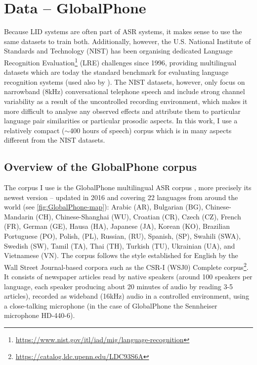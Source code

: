 \documentclass[bsc,frontabs,twoside,singlespacing,parskip,deptreport]{infthesis}
\begin{document}
\chapter{Data -- GlobalPhone}{
  \label{chap:Data}
  Because LID systems are often part of ASR systems, it makes sense to use the same datasets to train both.
  Additionally, however, the U.S. National Institute of Standards and Technology (NIST) has been organising dedicated Language Recognition Evaluation\footnote{\url{https://www.nist.gov/itl/iad/mig/language-recognition}} (LRE) challenges since 1996, providing multilingual datasets which are today the standard benchmark for evaluating language recognition systems (used also by \citet{Snyder_et_al_2018}). The NIST datasets, however, only focus on narrowband (8kHz) conversational telephone speech and include strong channel variability as a result of the uncontrolled recording environment, which makes it more difficult to analyse any observed effects and attribute them to particular language pair similarities or particular prosodic aspects.
  In this work, I use a relatively compact ($\sim$400 hours of speech) corpus which is in many aspects different from the NIST datasets.

  \section{Overview of the GlobalPhone corpus}{
    \label{sec:GlobalPhone}    
    The corpus I use is the GlobalPhone multilingual ASR corpus \citep{Schultz_et_al_2013}, more precisely its newest version -- updated in 2016 and covering 22 languages from around the world (see \autoref{fig:GlobalPhone-map}): Arabic (AR), Bulgarian (BG), Chinese-Mandarin (CH), Chinese-Shanghai (WU), Croatian (CR), Czech (CZ), French (FR), German (GE), Hausa (HA), Japanese (JA), Korean (KO), Brazilian Portuguese (PO), Polish, (PL), Russian, (RU), Spanish, (SP), Swahili (SWA), Swedish (SW), Tamil (TA), Thai (TH), Turkish (TU), Ukrainian (UA), and Vietnamese (VN). The corpus follows the style established for English by the Wall Street Journal-based corpora \citep{Paul_Baker_1992} such as the CSR-I (WSJ0) Complete corpus\footnote{\url{https://catalog.ldc.upenn.edu/LDC93S6A}}. It consists of newspaper articles read by native speakers (around 100 speakers per language, each speaker producing about 20 minutes of audio by reading 3-5 articles), recorded as wideband (16kHz) audio in a controlled environment, using a close-talking microphone (in the case of GlobalPhone the Sennheiser microphone HD-440-6).

}}
\end{document}
